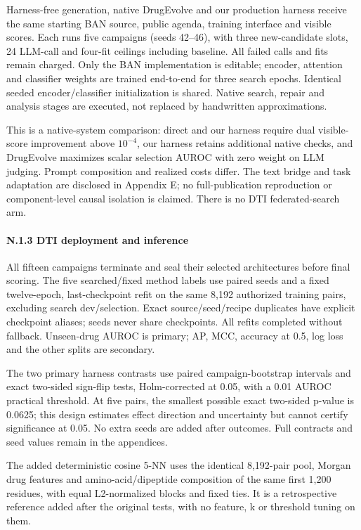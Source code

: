 Harness-free generation, native DrugEvolve and our production harness receive the same starting BAN source, public agenda, training interface and visible scores. Each runs five campaigns (seeds 42--46), with three new-candidate slots, 24 LLM-call and four-fit ceilings including baseline. All failed calls and fits remain charged. Only the BAN implementation is editable; encoder, attention and classifier weights are trained end-to-end for three search epochs. Identical seeded encoder/classifier initialization is shared. Native search, repair and analysis stages are executed, not replaced by handwritten approximations.

This is a native-system comparison: direct and our harness require dual visible-score improvement above $10^{-4}$, our harness retains additional native checks, and DrugEvolve maximizes scalar selection AUROC with zero weight on LLM judging. Prompt composition and realized costs differ. The text bridge and task adaptation are disclosed in Appendix E; no full-publication reproduction or component-level causal isolation is claimed. There is no DTI federated-search arm.

\paragraph{N.1.3 DTI deployment and inference}
All fifteen campaigns terminate and seal their selected architectures before final scoring. The five searched/fixed method labels use paired seeds and a fixed twelve-epoch, last-checkpoint refit on the same 8,192 authorized training pairs, excluding search dev/selection. Exact source/seed/recipe duplicates have explicit checkpoint aliases; seeds never share checkpoints. All refits completed without fallback. Unseen-drug AUROC is primary; AP, MCC, accuracy at 0.5, log loss and the other splits are secondary.

The two primary harness contrasts use paired campaign-bootstrap intervals and exact two-sided sign-flip tests, Holm-corrected at 0.05, with a 0.01 AUROC practical threshold. At five pairs, the smallest possible exact two-sided p-value is 0.0625; this design estimates effect direction and uncertainty but cannot certify significance at 0.05. No extra seeds are added after outcomes. Full contracts and seed values remain in the appendices.

The added deterministic cosine 5-NN uses the identical 8,192-pair pool, Morgan drug features and amino-acid/dipeptide composition of the same first 1,200 residues, with equal L2-normalized blocks and fixed ties. It is a retrospective reference added after the original tests, with no feature, k or threshold tuning on them.

